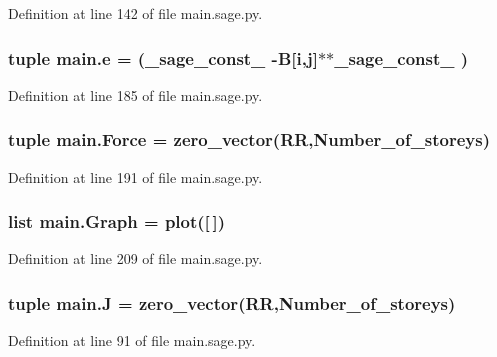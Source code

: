 Definition at line 142 of file main.\+sage.\+py.

\hypertarget{namespacemain_aa7f4fe671f919f7f067f9337ef9e02c0}{}
\subsubsection[{e}]{\setlength{\rightskip}{0pt plus 5cm}tuple main.\+e = (\+\_\+sage\+\_\+const\+\_ -\/{\bf B}\mbox{[}{\bf i},{\bf j}\mbox{]}$\ast$$\ast${\bf \+\_\+sage\+\_\+const\+\_} )}\label{namespacemain_aa7f4fe671f919f7f067f9337ef9e02c0}


Definition at line 185 of file main.\+sage.\+py.

\hypertarget{namespacemain_a4612305e50326c88dea04736a647c238}{}
\subsubsection[{Force}]{\setlength{\rightskip}{0pt plus 5cm}tuple main.\+Force = zero\+\_\+vector(R\+R,Number\+\_\+of\+\_\+storeys)}\label{namespacemain_a4612305e50326c88dea04736a647c238}


Definition at line 191 of file main.\+sage.\+py.

\hypertarget{namespacemain_ad40f6b3437e83a0385177ac65a317b97}{}
\subsubsection[{Graph}]{\setlength{\rightskip}{0pt plus 5cm}list main.\+Graph = plot(\mbox{[}$\,$\mbox{]})}\label{namespacemain_ad40f6b3437e83a0385177ac65a317b97}


Definition at line 209 of file main.\+sage.\+py.

\hypertarget{namespacemain_a00488f5887e168f7781b6fb94dd08518}{}
\subsubsection[{J}]{\setlength{\rightskip}{0pt plus 5cm}tuple main.\+J = zero\+\_\+vector(R\+R,Number\+\_\+of\+\_\+storeys)}\label{namespacemain_a00488f5887e168f7781b6fb94dd08518}


Definition at line 91 of file main.\+sage.\+py.

\hypertarget{namespacemain_a027916efc284622d928c1d8383917f6d}{}
